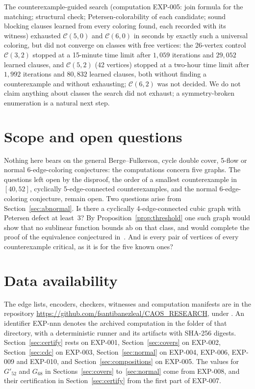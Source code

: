 \documentclass[11pt]{article}
\theoremstyle{definition}
\theoremstyle{remark}
\newcommand{\Gftyb}{G'_{52}}
\newcommand{\Gsix}{G_{68}}
\newcommand{\ab}{\mathrm{ab}}
\begin{document}
The counterexample-guided search (computation EXP-005: join formula for the matching; structural
check; Petersen-colorability of each candidate; sound blocking clauses learned from every
coloring found, each recorded with its witness) exhausted $\mathcal C(5,0)$ and $\mathcal C(6,0)$
in seconds by exactly such a universal coloring, but did not converge on classes with free
vertices: the 26-vertex control $\mathcal C(3,2)$ stopped at a 15-minute time limit after
$1{,}059$ iterations and $29{,}052$ learned clauses, and $\mathcal C(5,2)$ (42 vertices) stopped at
a two-hour time limit after $1{,}992$ iterations and $80{,}832$ learned clauses, both without
finding a counterexample and without exhausting; $\mathcal C(6,2)$ was not decided. We do not
claim anything about classes the search did not exhaust; a symmetry-broken enumeration is a
natural next step.

\section{Scope and open questions}\label{sec:open}

Nothing here bears on the general Berge--Fulkerson, cycle double cover, 5-flow or normal
6-edge-coloring conjectures: the computations concern five graphs. The questions left open by the
disproof, the order of a smallest counterexample in $[40, 52]$, cyclically 5-edge-connected
counterexamples, and the normal 6-edge-coloring conjecture, remain open. Two questions arise from
Section~\ref{sec:abnormal}. Is there a cyclically 4-edge-connected cubic graph with Petersen defect
at least~3? By Proposition~\ref{prop:threshold} one such graph would show that no sublinear
function bounds $\ab$ on that class, and would complete the proof of the equivalence conjectured
in~\cite{MMM2021}. And is every pair of vertices of every counterexample critical, as it is for
the five known ones?

\section*{Data availability}

{\raggedright
The edge lists, encoders, checkers, witnesses and computation manifests are in the repository
\url{https://github.com/fsantibanezleal/CAOS_RESEARCH}, under
. An identifier EXP-nnn denotes the archived
computation in the folder  of that directory, with a deterministic
runner and its artifacts with SHA-256 digests. Section~\ref{sec:certify} rests on EXP-001,
Section~\ref{sec:covers} on EXP-002, Section~\ref{sec:cdc} on EXP-003,
Section~\ref{sec:normal} on EXP-004, EXP-006, EXP-009 and EXP-010, and
Section~\ref{sec:compositions} on EXP-005. The values for $\Gftyb$ and $\Gsix$ in
Sections~\ref{sec:covers} to~\ref{sec:normal} come from EXP-008, and their certification in
Section~\ref{sec:certify} from the first part of EXP-007.
\par}
\end{document}
